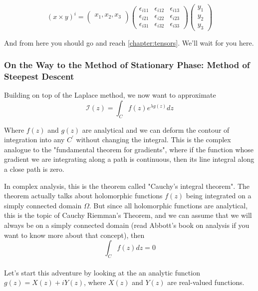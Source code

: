 $$
\left( x \times y \right)^i =
\begin{pmatrix}
    x_1, x_2, x_3 \\
\end{pmatrix}
\begin{pmatrix}
    \epsilon_{i11} & \epsilon_{i12} & \epsilon_{i13} \\
    \epsilon_{i21} & \epsilon_{i22} & \epsilon_{i23} \\
    \epsilon_{i31} & \epsilon_{i32} & \epsilon_{i33}
\end{pmatrix}
\begin{pmatrix}
    y_1 \\
    y_2 \\
    y_3
\end{pmatrix}
$$

And from here you should go and reach \ref{chapter:tensors}.
We'll wait for you here.




\subsubsection{On the Way to the Method of Stationary Phase: Method of Steepest Descent}

Building on top of the Laplace method, we now want to approximate
$$
\mathcal{I}(z) 
= \int_{C} f(z) e^{\lambda g(z)} dz
$$

Where $f(z)$ and $g(z)$ are analytical and we can deform the contour of integration
into any $C^\prime$ without changing the integral.
This is the complex analogue to the "fundamental theorem for gradients", where if the function whose gradient we are
integrating along a path is continuous, then its line integral along a close path is zero.

In complex analysis, this is the theorem called "Cauchy's integral theorem".
The theorem actually talks about holomorphic functions $f(z)$ being integrated on a simply connected
domain $\Omega$.
But since all holomorphic functions are analytical, this is the topic of Cauchy Riemman's Theorem,
and we can assume that we will always be on a simply connected domain (read Abbott's book on
analysis if you want to know more about that concept), then
$$
\int_{C} f(z) dz = 0
$$
\\



Let's start this adventure by looking at the an analytic function $g(z) = X(z) + iY(z)$,
where $X(z)$ and $Y(z)$ are real-valued functions.


